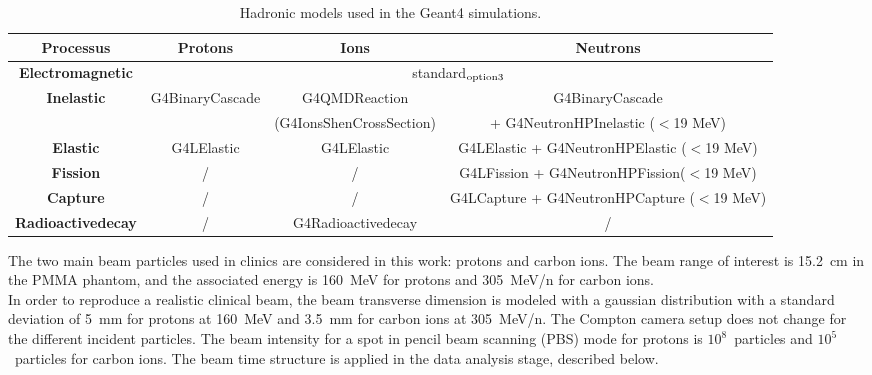 
\begin{table}[ht]
\label{physlist_ion}
\caption{Hadronic models used in the Geant4 simulations.}
\begin{scriptsize}
\begin{center}
\renewcommand{\arraystretch}{1.2}
\begin{tabular} {cccc}\hline
\textbf{Processus} & \textbf{Protons} & \textbf{Ions} & \textbf{Neutrons} \\ \hline 
\textbf{Electromagnetic} & \multicolumn{3}{c}{standard$_{\rm{option3}}$} \\ %
\textbf{Inelastic} & G4BinaryCascade & G4QMDReaction  &  G4BinaryCascade  \\ 
 & & (G4IonsShenCrossSection)&+ G4NeutronHPInelastic ($<$19 MeV)\\ %
\textbf{Elastic} & G4LElastic & G4LElastic & G4LElastic + G4NeutronHPElastic ($<$19 MeV)\\ %
\textbf{Fission} & / & / & G4LFission + G4NeutronHPFission($<$19 MeV) \\ %
\textbf{Capture} & / & / & G4LCapture +  G4NeutronHPCapture ($<$19 MeV) \\ %
\textbf{Radioactivedecay} & / & G4Radioactivedecay & / \\ \hline
\end{tabular}
\end{center}
\end{scriptsize}
\label{table:table_modele_physic_CC_simulation_Hadronth}
\end{table}

The two main beam particles used in clinics are considered in this work: protons and carbon ions. The beam range of interest is 15.2~cm in the PMMA phantom, and the associated energy is 160~MeV for protons and 305~MeV/n for carbon ions.\\ 
In order to reproduce a realistic clinical beam, the beam transverse dimension is modeled with a gaussian distribution with a standard deviation of 5~mm for protons at 160~MeV and 3.5~mm for carbon ions at 305~MeV/n. The Compton camera setup does not change for the different incident particles. The beam intensity for a spot in pencil beam scanning (PBS) mode for protons is $10^8$~particles and $10^5$~particles for carbon ions. The beam time structure is applied in the data analysis stage, described below.\newline

